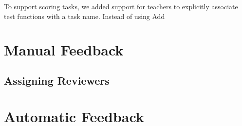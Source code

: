 \subsection{}

To support scoring tasks, we added support for teachers to explicitly associate test functions with a task name.
Instead of using Add

\section{Manual Feedback}

\subsection{Assigning Reviewers}

\section{Automatic Feedback}
